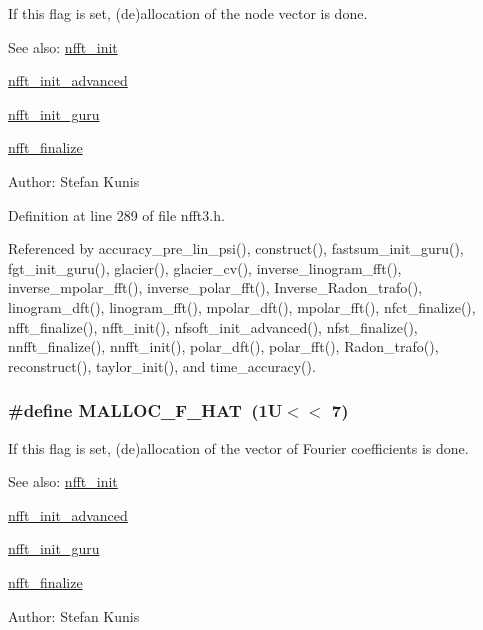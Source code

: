 If this flag is set, (de)allocation of the node vector is done. 

\begin{Desc}
\item[See also:]\hyperlink{group__nfft_g1dfeaf18f3735f035afa62ca768d99c4}{nfft\_\-init} 

\hyperlink{group__nfft_gcd4a22fd1f6ea476a57759a90510d114}{nfft\_\-init\_\-advanced} 

\hyperlink{group__nfft_g406f05717c6299b918261c61aaa9de23}{nfft\_\-init\_\-guru} 

\hyperlink{group__nfft_g614f9f7af5b0d5491afa9495393c4dc3}{nfft\_\-finalize} \end{Desc}
\begin{Desc}
\item[Author:]Stefan Kunis \end{Desc}


Definition at line 289 of file nfft3.h.

Referenced by accuracy\_\-pre\_\-lin\_\-psi(), construct(), fastsum\_\-init\_\-guru(), fgt\_\-init\_\-guru(), glacier(), glacier\_\-cv(), inverse\_\-linogram\_\-fft(), inverse\_\-mpolar\_\-fft(), inverse\_\-polar\_\-fft(), Inverse\_\-Radon\_\-trafo(), linogram\_\-dft(), linogram\_\-fft(), mpolar\_\-dft(), mpolar\_\-fft(), nfct\_\-finalize(), nfft\_\-finalize(), nfft\_\-init(), nfsoft\_\-init\_\-advanced(), nfst\_\-finalize(), nnfft\_\-finalize(), nnfft\_\-init(), polar\_\-dft(), polar\_\-fft(), Radon\_\-trafo(), reconstruct(), taylor\_\-init(), and time\_\-accuracy().\hypertarget{group__nfft_g02d52cb02b6cfdbc3e4d5fd4de1aef9e}{
\subsubsection{\setlength{\rightskip}{0pt plus 5cm}\#define MALLOC\_\-F\_\-HAT~(1U$<$$<$ 7)}}
\label{group__nfft_g02d52cb02b6cfdbc3e4d5fd4de1aef9e}


If this flag is set, (de)allocation of the vector of Fourier coefficients is done. 

\begin{Desc}
\item[See also:]\hyperlink{group__nfft_g1dfeaf18f3735f035afa62ca768d99c4}{nfft\_\-init} 

\hyperlink{group__nfft_gcd4a22fd1f6ea476a57759a90510d114}{nfft\_\-init\_\-advanced} 

\hyperlink{group__nfft_g406f05717c6299b918261c61aaa9de23}{nfft\_\-init\_\-guru} 

\hyperlink{group__nfft_g614f9f7af5b0d5491afa9495393c4dc3}{nfft\_\-finalize} \end{Desc}
\begin{Desc}
\item[Author:]Stefan Kunis \end{Desc}



